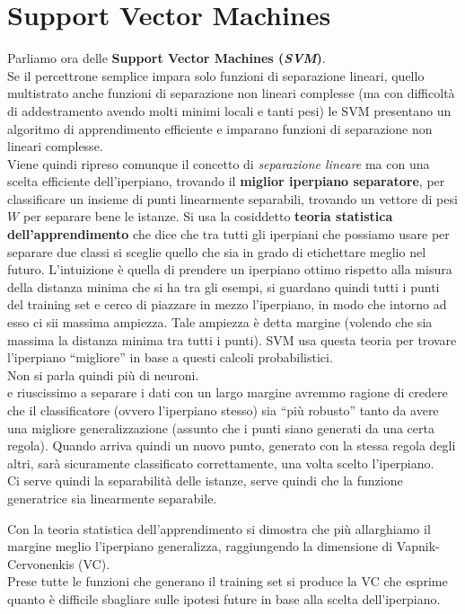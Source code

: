 \documentclass[a4paper,12pt, oneside]{book}
\begin{document}
\section{Support Vector Machines}
Parliamo ora delle \textbf{Support Vector Machines (\textit{SVM})}.\\
Se il percettrone semplice impara solo funzioni di separazione lineari, quello
multistrato anche funzioni di separazione non lineari complesse (ma con
difficoltà di addestramento avendo molti minimi locali e tanti pesi) le SVM
presentano un algoritmo di apprendimento efficiente e imparano funzioni di
separazione non lineari complesse.\\
Viene quindi ripreso comunque il concetto di \textit{separazione lineare} ma con
una scelta efficiente dell'iperpiano, trovando il \textbf{miglior iperpiano
  separatore}, per classificare un insieme di punti linearmente separabili,
trovando un vettore di pesi $W$ per separare bene le istanze. Si usa la
cosiddetto \textbf{teoria statistica dell’apprendimento} che dice che tra tutti
gli iperpiani che possiamo usare per separare due classi si sceglie quello che
sia in grado di etichettare meglio nel futuro. L'intuizione è quella di prendere
un iperpiano ottimo rispetto alla misura della distanza minima che si ha tra gli
esempi, si guardano quindi tutti i punti del training set e cerco di piazzare in
mezzo l'iperpiano, in modo che intorno ad esso ci sii massima ampiezza. Tale
ampiezza è detta margine (volendo che sia massima la distanza minima tra tutti i
punti). SVM usa questa teoria per trovare l'iperpiano ``migliore'' in base a
questi calcoli probabilistici. \\
Non si parla quindi più di neuroni.\\
e riuscissimo a separare i dati con un largo margine
avremmo ragione di credere che il classificatore (ovvero l'iperpiano stesso) sia
``più robusto'' tanto da avere una migliore generalizzazione (assunto che i
punti siano generati da una certa regola).
Quando arriva quindi un nuovo punto, generato con la stessa regola degli altri,
sarà sicuramente classificato correttamente, una volta scelto l'iperpiano.\\
Ci serve quindi la separabilità delle istanze, serve quindi che la funzione
generatrice sia linearmente separabile.
\begin{teorema}
  Con la teoria statistica dell'apprendimento si dimostra che più allarghiamo il
  margine meglio l’iperpiano generalizza, raggiungendo la dimensione di
  Vapnik-Cervonenkis (VC).\\
  Prese tutte le funzioni che generano il training set si produce la VC che
  esprime quanto è difficile sbagliare sulle ipotesi future in base alla scelta
  dell'iperpiano.
\end{teorema}
\end{document}
